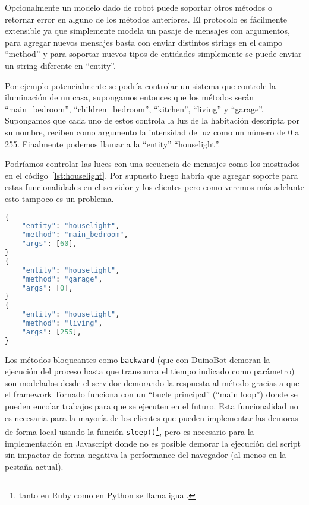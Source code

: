 Opcionalmente un modelo dado de robot puede soportar otros métodos o retornar
error en alguno de los métodos anteriores. El protocolo es fácilmente
extensible ya que simplemente modela un pasaje de mensajes con argumentos,
para agregar nuevos mensajes basta con enviar distintos strings en el
campo ``method'' y para soportar nuevos tipos de entidades simplemente
se puede enviar un string diferente en ``entity''.

Por ejemplo potencialmente
se podría controlar un sistema que controle la iluminación de un casa,
supongamos entonces que los métodos serán ``main\_bedroom'', ``children\_bedroom'',
``kitchen'', ``living'' y ``garage''. Supongamos que cada uno de estos
controla la luz de la habitación descripta por su nombre, reciben como
argumento la intensidad de luz como un número de 0 a 255. Finalmente
podemos llamar a la ``entity'' ``houselight''.

Podríamos controlar las luces con una secuencia de mensajes como
los mostrados en el código~\ref{lst:houselight}. Por supuesto luego
habría que agregar soporte para estas funcionalidades en el servidor
y los clientes pero como veremos más adelante esto tampoco es
un problema.

\begin{lstlisting}[language=python,
caption={Ejemplo de una posible extensión al protocolo para controlar
las luces de una casa},
label=lst:houselight]
{
    "entity": "houselight",
    "method": "main_bedroom",
    "args": [60],
}
{
    "entity": "houselight",
    "method": "garage",
    "args": [0],
}
{
    "entity": "houselight",
    "method": "living",
    "args": [255],
}
\end{lstlisting}


Los métodos bloqueantes como \texttt{backward} (que con DuinoBot demoran
la ejecución del proceso hasta que transcurra el tiempo indicado como
parámetro) son modelados desde el servidor demorando la respuesta al método
gracias a que el framework Tornado funciona con un ``bucle principal''
(``main loop'') donde se pueden encolar trabajos para que se ejecuten
en el futuro.
Esta funcionalidad no es necesaria para la mayoría de los clientes que
pueden implementar las demoras de forma local usando la función
\texttt{sleep()}\footnote{tanto en Ruby como en Python se llama igual.},
pero es necesario para la implementación en Javascript donde no es posible
demorar la ejecución del script sin impactar de forma negativa la performance
del navegador (al menos en la pestaña actual).




